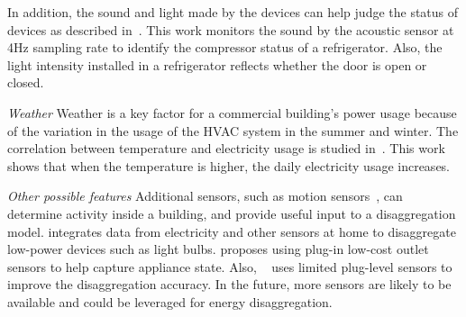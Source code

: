 In addition, the sound and light made by
the devices can help judge the status
of devices as described in~\cite{kim2009viridiscope}.
This work monitors the sound by the acoustic sensor 
at 4Hz sampling rate
to identify the compressor status of a refrigerator. 
Also, the light intensity installed in a refrigerator reflects 
whether the door is open or closed.

%

\textit{Weather}
Weather is a key factor for a commercial building's power usage
because of the variation in the usage of the HVAC system in the summer and winter.
The correlation between temperature and electricity usage 
is studied in~\cite{pardo2002temperature}. 
This work shows that
when the temperature is higher, 
the daily electricity usage increases. 

\textit{Other possible features}
Additional sensors, such as motion sensors~\cite{cook2011sensor}, 
can determine activity inside a building, and provide useful input to a
disaggregation model.
\cite{srinivasan2013fixturefinder} integrates data from electricity 
and other sensors at home to disaggregate  low-power 
devices such as light bulbs. \cite{wu2012low} proposes using plug-in low-cost outlet sensors to help capture 
appliance state. 
Also, ~\cite{uttama2013sustainable} uses limited plug-level sensors to improve the 
disaggregation accuracy. 
In the future, more sensors are likely to be available and could be leveraged for 
energy disaggregation.


